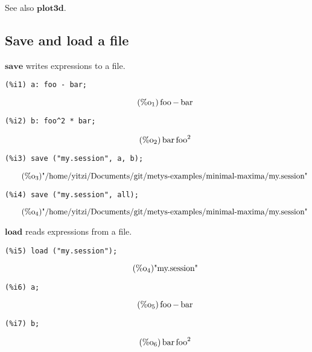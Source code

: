 \documentclass[12pt,leqno]{article}
\begin{document}
See also $\mathbf{plot3d}$.

\subsection{Save and load a file}

$\mathbf{save}$ writes expressions to a file.
\begin{verbatim}
(%i1) a: foo - bar;
\end{verbatim}
\begin{equation}
\tag{$\mathop{\mathrm{\%o}}_{1}$}\mathop{\mathrm{foo}}-\mathop{\mathrm{bar}}
\label{eq:doc-group1-code32-1-1}
\end{equation}
\begin{verbatim}
(%i2) b: foo^2 * bar;
\end{verbatim}
\begin{equation}
\tag{$\mathop{\mathrm{\%o}}_{2}$}\mathop{\mathrm{bar}} {\mathop{\mathrm{foo}}}^{2}
\label{eq:doc-group1-code32-2-1}
\end{equation}
\begin{verbatim}
(%i3) save ("my.session", a, b);
\end{verbatim}
\begin{equation}
\tag{$\mathop{\mathrm{\%o}}_{3}$}\mbox{"/home/yitzi/Documents/git/metys-examples/minimal-maxima/my.session"}
\label{eq:doc-group1-code32-3-1}
\end{equation}
\begin{verbatim}
(%i4) save ("my.session", all);
\end{verbatim}
\begin{equation}
\tag{$\mathop{\mathrm{\%o}}_{4}$}\mbox{"/home/yitzi/Documents/git/metys-examples/minimal-maxima/my.session"}
\label{eq:doc-group1-code32-4-1}
\end{equation}


$\mathbf{load}$ reads expressions from a file.
\begin{verbatim}
(%i5) load ("my.session");
\end{verbatim}
\begin{equation}
\tag{$\mathop{\mathrm{\%o}}_{4}$}\mbox{"my.session"}
\label{eq:doc-group1-code33-1-1}
\end{equation}
\begin{verbatim}
(%i6) a;
\end{verbatim}
\begin{equation}
\tag{$\mathop{\mathrm{\%o}}_{5}$}\mathop{\mathrm{foo}}-\mathop{\mathrm{bar}}
\label{eq:doc-group1-code33-2-1}
\end{equation}
\begin{verbatim}
(%i7) b;
\end{verbatim}
\begin{equation}
\tag{$\mathop{\mathrm{\%o}}_{6}$}\mathop{\mathrm{bar}} {\mathop{\mathrm{foo}}}^{2}
\label{eq:doc-group1-code33-3-1}
\end{equation}
\end{document}

